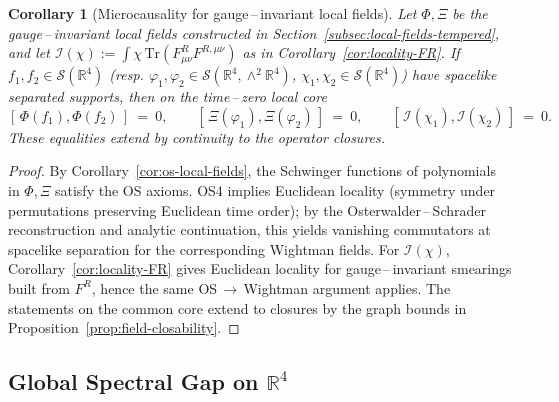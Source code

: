 \documentclass[11pt]{amsart}
\theoremstyle{plain}
\newtheorem{corollary}[theorem]{Corollary}
\theoremstyle{definition}
\theoremstyle{remark}
\begin{document}
\begin{corollary}[Microcausality for gauge\,--\,invariant local fields]\label{cor:microcausality}
Let $\Phi,\Xi$ be the gauge\,--\,invariant local fields constructed in Section~\ref{subsec:local-fields-tempered}, and let $\mathcal I(\chi):=\int \chi\,\mathrm{Tr}(F^R_{\mu\nu}F^{R,\mu\nu})$ as in Corollary~\ref{cor:locality-FR}. If $f_1,f_2\in\mathcal S(\mathbb R^4)$ (resp. $\varphi_1,\varphi_2\in\mathcal S(\mathbb R^4,\wedge^2\mathbb R^4)$, $\chi_1,\chi_2\in\mathcal S(\mathbb R^4)$) have spacelike separated supports, then on the time\,–\,zero local core
\[
  [\,\Phi(f_1),\Phi(f_2)\,]\ =\ 0,\qquad [\,\Xi(\varphi_1),\Xi(\varphi_2)\,]\ =\ 0,\qquad [\,\mathcal I(\chi_1),\mathcal I(\chi_2)\,]\ =\ 0.
\]
These equalities extend by continuity to the operator closures.
\end{corollary}
\begin{proof}
By Corollary~\ref{cor:os-local-fields}, the Schwinger functions of polynomials in $\Phi,\Xi$ satisfy the OS axioms. OS4 implies Euclidean locality (symmetry under permutations preserving Euclidean time order); by the Osterwalder\,–\,Schrader reconstruction and analytic continuation, this yields vanishing commutators at spacelike separation for the corresponding Wightman fields. For $\mathcal I(\chi)$, Corollary~\ref{cor:locality-FR} gives Euclidean locality for gauge\,–\,invariant smearings built from $F^R$, hence the same OS\,$\to$\,Wightman argument applies. The statements on the common core extend to closures by the graph bounds in Proposition~\ref{prop:field-closability}.
\end{proof}

\subsection{Global Spectral Gap on $\mathbb R^4$}
\end{document}
